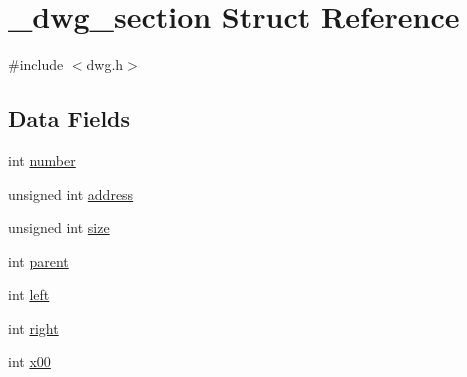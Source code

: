 \hypertarget{struct__dwg__section}{\section{\-\_\-dwg\-\_\-section \-Struct \-Reference}
\label{struct__dwg__section}
}


{\ttfamily \#include $<$dwg.\-h$>$}

\subsection*{\-Data \-Fields}
\begin{DoxyCompactItemize}
\item 
int \hyperlink{struct__dwg__section_aba43d155eaac81cf4377d8dca3fd53f7}{number}
\item 
unsigned int \hyperlink{struct__dwg__section_abc0bb64cc1d17611b1604684138f005f}{address}
\item 
unsigned int \hyperlink{struct__dwg__section_a62d6f504db4ba0a86f1e506ae7937dda}{size}
\item 
int \hyperlink{struct__dwg__section_adcbc9ecfc4380da9935a8b9b67dc4590}{parent}
\item 
int \hyperlink{struct__dwg__section_a73c62582f8439733531734a89d4afcb6}{left}
\item 
int \hyperlink{struct__dwg__section_af4af98e040e5d044ad94ceaf1a87ec8a}{right}
\item 
int \hyperlink{struct__dwg__section_af5a645c9c8aec90c3f542367183517ef}{x00}
\end{DoxyCompactItemize}


